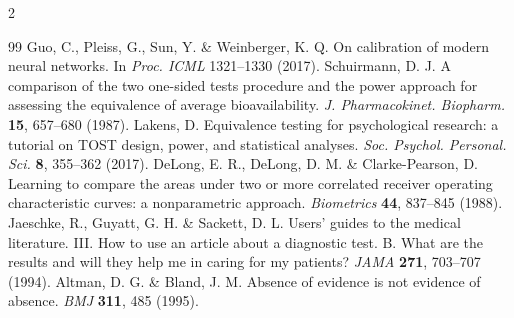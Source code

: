 \documentclass[10pt,a4paper,twoside]{article}
\begin{document}
\begin{multicols}{2}
\begin{thebibliography}{99}
 Guo, C., Pleiss, G., Sun, Y. \& Weinberger, K. Q. On calibration of modern neural networks. In \textit{Proc. ICML} 1321--1330 (2017).
 Schuirmann, D. J. A comparison of the two one-sided tests procedure and the power approach for assessing the equivalence of average bioavailability. \textit{J. Pharmacokinet. Biopharm.} \textbf{15}, 657--680 (1987).
 Lakens, D. Equivalence testing for psychological research: a tutorial on TOST design, power, and statistical analyses. \textit{Soc. Psychol. Personal. Sci.} \textbf{8}, 355--362 (2017).
 DeLong, E. R., DeLong, D. M. \& Clarke-Pearson, D. Learning to compare the areas under two or more correlated receiver operating characteristic curves: a nonparametric approach. \textit{Biometrics} \textbf{44}, 837--845 (1988).
 Jaeschke, R., Guyatt, G. H. \& Sackett, D. L. Users' guides to the medical literature. III. How to use an article about a diagnostic test. B. What are the results and will they help me in caring for my patients? \textit{JAMA} \textbf{271}, 703--707 (1994).
 Altman, D. G. \& Bland, J. M. Absence of evidence is not evidence of absence. \textit{BMJ} \textbf{311}, 485 (1995).
\end{thebibliography}

\end{multicols}
\end{document}
